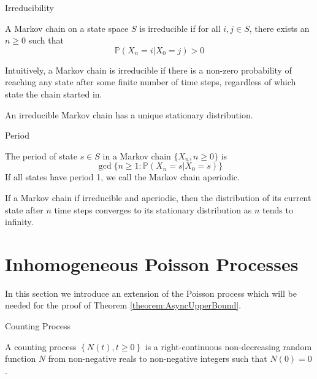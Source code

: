 \begin{definition}
	Irreducibility

	\noindent
	A Markov chain on a state space $S$ is irreducible if for all $i, j \in S$, there exists an $n \geq 0$ such that 
	$$
		\mathbb{P}(X_n = i | X_0 = j) > 0
	$$
\end{definition}

Intuitively, a Markov chain is irreducible if there is a non-zero probability of reaching any state after some finite number of time steps, regardless of which state the chain started in.

\begin{theorem}\label{theorem:uniqueStationaryDistribution}
	An irreducible Markov chain has a unique stationary distribution.
\end{theorem}

\begin{definition}
	Period

	\noindent
	The period of state $s \in S$ in a Markov chain $\{X_n, n \geq 0 \}$ is
	$$
		\gcd\{ n \geq 1 : \mathbb{P}(X_n = s | X_0 = s)\}
	$$
	If all states have period 1, we call the Markov chain aperiodic.
\end{definition}


\begin{theorem}\label{theorem:markovChainConvergence}
	If a Markov chain if irreducible and aperiodic, then the distribution of its current state after $n$ time steps converges to its stationary distribution as $n$ tends to infinity.
\end{theorem}


\section{Inhomogeneous Poisson Processes}\label{section:inhomoPP}

In this section we introduce an extension of the Poisson process which will be needed for the proof of Theorem \ref{theorem:AsyncUpperBound}.

\begin{definition}
	Counting Process

	\noindent
	A counting process $\left\{ N(t), t \geq 0 \right\}$ is a right-continuous non-decreasing random function $N$ from non-negative reals to non-negative integers such that $N(0) = 0$.
\end{definition}

